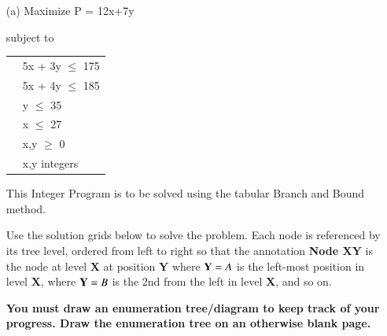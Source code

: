 \documentclass[12pt]{article}
\begin{document}
				\begin{itemize}
					\item[(a)] 
					Maximize P = 12x+7y 
					
					subject to
					
					\begin{tabular}{cl}
						
						\phantom{space}
						\phantom{space} & 5x + 3y $\leq$ 175\\
						& 5x  + 4y $\leq$ 185\\
						& y $\leq$ 35\\
						& x $\leq$ 27\\
						& x,y $\geq$ 0\\
						& x,y integers\\
						
					\end{tabular} 
					
					\smallskip
					This Integer Program is to be solved using the tabular Branch and Bound method.
					
					\newpage
					Use the solution grids below to solve the problem. Each node is referenced by its tree level, ordered from left to right so that the annotation {\bf Node XY} is the node at level {\bf X} at position {\bf Y} where ${\bf Y}=A$ is the left-most position in level {\bf X}, where ${\bf Y}=B$ is the 2nd from the left in level {\bf X}, and so on. 
					
					{\bf You must draw an enumeration tree/diagram to keep track of your progress. Draw the enumeration tree on an otherwise blank page.}
					
					
					
					
					
					
				\end{itemize}
				
\end{document}
